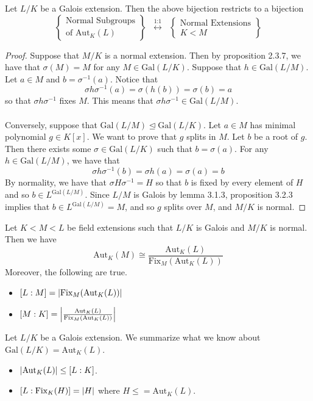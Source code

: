 \documentclass[a4paper]{article}
\begin{document}
\begin{prp}{}{} Let $L/K$ be a Galois extension. Then the above bijection restricts to a bijection $$\left\{\substack{\text{Normal Subgroups}\\\text{of }\text{Aut}_K(L)}\right\}\;\;\overset{\text{1:1}}{\longleftrightarrow}\;\;\left\{\substack{\text{Normal Extensions}\\ K<M}\right\}$$ \tcbline
\begin{proof}
Suppose that $M/K$ is a normal extension. Then by proposition 2.3.7, we have that $\sigma(M)=M$ for any $M\in\text{Gal}(L/K)$. Suppose that $h\in\text{Gal}(L/M)$. Let $a\in M$ and $b=\sigma^{-1}(a)$. Notice that $$\sigma h\sigma^{-1}(a)=\sigma(h(b))=\sigma(b)=a$$ so that $\sigma h\sigma^{-1}$ fixes $M$. This means that $\sigma h\sigma^{-1}\in\text{Gal}(L/M)$. \\~\\

Conversely, suppose that $\text{Gal}(L/M)\trianglelefteq\text{Gal}(L/K)$. Let $a\in M$ has minimal polynomial $g\in K[x]$. We want to prove that $g$ splits in $M$. Let $b$ be a root of $g$. Then there exists some $\sigma\in\text{Gal}(L/K)$ such that $b=\sigma(a)$. For any $h\in\text{Gal}(L/M)$, we have that $$\sigma h\sigma^{-1}(b)=\sigma h(a)=\sigma(a)=b$$ By normality, we have that $\sigma H\sigma^{-1}=H$ so that $b$ is fixed by every element of $H$ and so $b\in L^{\text{Gal}(L/M)}$. Since $L/M$ is Galois by lemma 3.1.3, proposition 3.2.3 implies that $b\in L^{\text{Gal}(L/M)}=M$, and so $g$ splits over $M$, and $M/K$ is normal. 
\end{proof}
\end{prp}

\begin{prp}{}{} Let $K<M<L$ be field extensions such that $L/K$ is Galois and $M/K$ is normal. Then we have $$\text{Aut}_K(M)\cong\frac{\text{Aut}_K(L)}{\text{Fix}_M(\text{Aut}_K(L))}$$ Moreover, the following are true. 
\begin{itemize}
\item $[L:M]=\abs{\text{Fix}_M(\text{Aut}_K(L))}$
\item $[M:K]=\abs{\frac{\text{Aut}_K(L)}{\text{Fix}_M(\text{Aut}_K(L))}}$
\end{itemize}
\end{prp}

Let $L/K$ be a Galois extension. We summarize what we know about $\text{Gal}(L/K)=\text{Aut}_K(L)$. 
\begin{itemize}
\item $\abs{\text{Aut}_K(L)}\leq [L:K]$. 
\item $[L:\text{Fix}_K(H)]=\abs{H}$ where $H\leq=\text{Aut}_K(L)$. 
\end{itemize}
\end{document}
